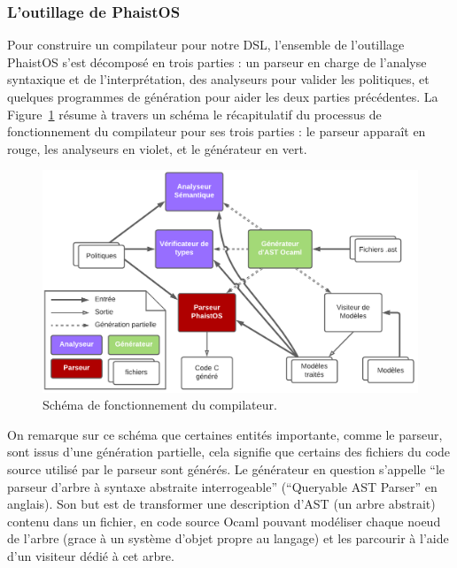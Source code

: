 \subsubsection{L'outillage de PhaistOS}

Pour construire un compilateur pour notre DSL, l'ensemble de l'outillage 
PhaistOS s'est décomposé en trois parties : un parseur en charge de l'analyse 
syntaxique et de l'interprétation, des analyseurs pour valider les politiques, 
et quelques programmes de génération pour aider les deux parties précédentes. 
La Figure~\ref{fig:compiler} résume à travers un schéma le récapitulatif du 
processus de fonctionnement du compilateur pour ses trois parties : le parseur 
apparaît en rouge, les analyseurs en violet, et le générateur en vert.

\begin{figure}[h!t] \centering
    \includegraphics[width=\textwidth]{images/compiler}
    \caption{Schéma de fonctionnement du compilateur.}
    \label{fig:compiler}
\end{figure}


On remarque sur ce schéma que certaines entités importante, comme le parseur, 
sont issus d'une génération partielle, cela signifie que certains des fichiers 
du code source utilisé par le parseur sont générés. Le générateur en question 
s'appelle ``le parseur d'arbre à syntaxe abstraite interrogeable'' (``Queryable 
AST Parser'' en anglais). Son but est de transformer une description d'AST (un 
arbre abstrait) contenu dans un fichier, en code source Ocaml pouvant modéliser 
chaque noeud de l'arbre (grace à un système d'objet propre au langage) et les 
parcourir à l'aide d'un visiteur dédié à cet arbre. 

